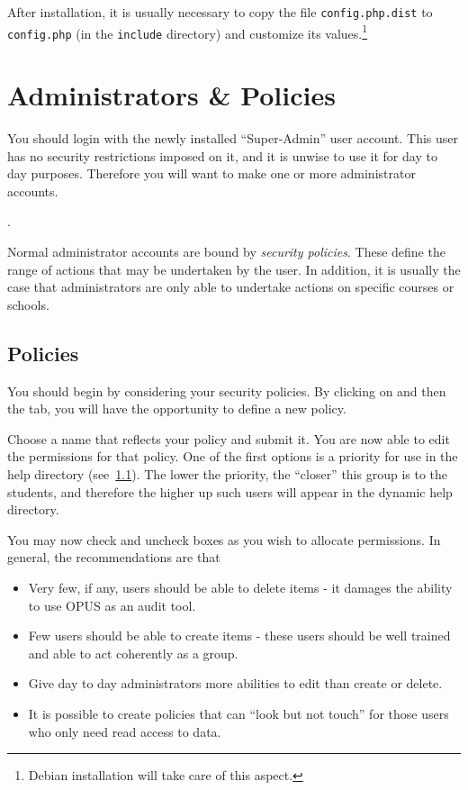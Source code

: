 \documentclass[12 pt]{book}
\begin{document}
After installation, it is usually necessary to copy the file \lstinline!config.php.dist! to
\lstinline!config.php! (in the \lstinline!include! directory) and customize its values.\footnote{Debian installation will take care of this aspect.}

\chapter{Administrators \& Policies}

You should login with the newly installed ``Super-Admin'' user account. This
user has no security restrictions imposed on it, and it is unwise to use it
for day to day purposes. Therefore you will want to make one or more administrator
accounts.

.

Normal administrator accounts are bound by \emph{security policies}. These define
the range of actions that may be undertaken by the user. In addition, it is usually
the case that administrators are only able to undertake actions on specific courses
or schools.

\section{Policies}

You should begin by considering your security policies. By clicking on
 and then the  tab,
you will have the opportunity to define a new policy.

Choose a name that reflects your policy and submit it. You are now able to
edit the permissions for that policy. One of the first options is a priority
for use in the help directory (see~\ref{}). The lower the priority, the 
``closer'' this group is to the students, and therefore the
higher up such users will appear in the dynamic help directory.

You may now check and uncheck boxes as you wish to allocate permissions. 
In general, the recommendations are that
\begin{itemize}
  \item Very few, if any, users should be able to delete items - it damages
    the ability to use OPUS as an audit tool.
  \item Few users should be able to create items - these users should be well
    trained and able to act coherently as a group.
  \item Give day to day administrators more abilities to edit than create or delete.
  \item It is possible to create policies that can ``look but not touch'' for those
    users who only need read access to data.
\end{itemize}
\end{document}
